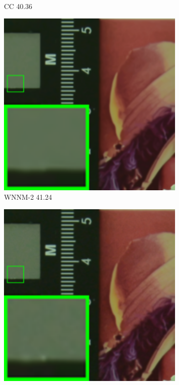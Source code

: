 \begin{figure}
\begin{subfigure}[t]{0.19\textwidth}
		\caption{CC 40.36}
    \end{subfigure}
    \hfill
    \begin{subfigure}[t]{0.19\textwidth}
        \centering
        \includegraphics[width=1\textwidth]{images/mcwnnm/resize_br_WNNMJ_CC15_d800_iso1600_2.png}
		\caption{WNNM-2 41.24}
    \end{subfigure}
    \hfill
    \begin{subfigure}[t]{0.19\textwidth}
        \centering
        \includegraphics[width=1\textwidth]{images/mcwnnm/resize_br_WNNM_ADMM_NL_CC15_d800_iso1600_2.png}

\end{subfigure}
\end{figure}
